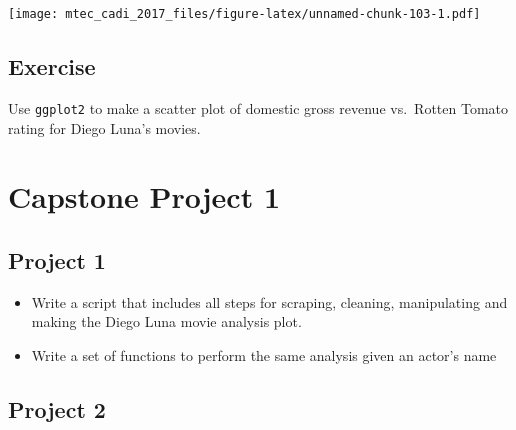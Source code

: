 \documentclass[12pt,]{book}
\newenvironment{Shaded}{\begin{snugshade}}{\end{snugshade}}
\newcommand{\KeywordTok}[1]{\textcolor[rgb]{0.13,0.29,0.53}{\textbf{#1}}}
\newcommand{\DataTypeTok}[1]{\textcolor[rgb]{0.13,0.29,0.53}{#1}}
\newcommand{\StringTok}[1]{\textcolor[rgb]{0.31,0.60,0.02}{#1}}
\newcommand{\OperatorTok}[1]{\textcolor[rgb]{0.81,0.36,0.00}{\textbf{#1}}}
\newcommand{\NormalTok}[1]{#1}
\theoremstyle{definition}
\theoremstyle{definition}
\theoremstyle{definition}
\theoremstyle{remark}
\begin{document}
\begin{Shaded}
\end{Shaded}

\texttt{[image: mtec\_cadi\_2017\_files/figure-latex/unnamed-chunk-103-1.pdf]}

\section{Exercise}\label{exercise-1}

Use \texttt{ggplot2} to make a scatter plot of domestic gross revenue
vs.~Rotten Tomato rating for Diego Luna's movies.

\chapter{Capstone Project 1}\label{capstone-project-1}

\section{Project 1}\label{project-1}

\begin{itemize}
\item
  Write a script that includes all steps for scraping, cleaning,
  manipulating and making the Diego Luna movie analysis plot.
\item
  Write a set of functions to perform the same analysis given an actor's
  name
\end{itemize}

\section{Project 2}\label{project-2}
\end{document}
